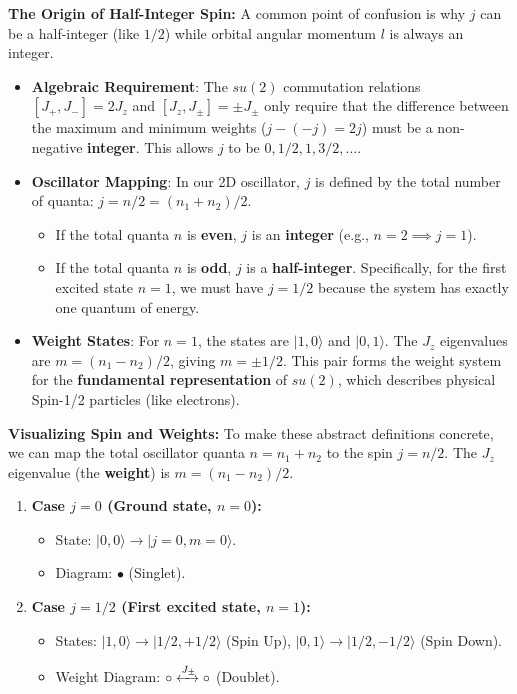 \begin{solution}
\begin{remark}
\textbf{The Origin of Half-Integer Spin:}
A common point of confusion is why $j$ can be a half-integer (like $1/2$) while orbital angular momentum $l$ is always an integer. 
\begin{itemize}
    \item \textbf{Algebraic Requirement}: The $su(2)$ commutation relations $[J_+, J_-] = 2J_z$ and $[J_z, J_\pm] = \pm J_\pm$ only require that the difference between the maximum and minimum weights ($j - (-j) = 2j$) must be a non-negative \textbf{integer}. This allows $j$ to be $0, 1/2, 1, 3/2, \dots$.
    \item \textbf{Oscillator Mapping}: In our 2D oscillator, $j$ is defined by the total number of quanta: $j = n/2 = (n_1 + n_2)/2$. 
    \begin{itemize}
        \item If the total quanta $n$ is \textbf{even}, $j$ is an \textbf{integer} (e.g., $n=2 \implies j=1$).
        \item If the total quanta $n$ is \textbf{odd}, $j$ is a \textbf{half-integer}. Specifically, for the first excited state $n=1$, we must have $j=1/2$ because the system has exactly one quantum of energy.
    \end{itemize}
    \item \textbf{Weight States}: For $n=1$, the states are $|1, 0\rangle$ and $|0, 1\rangle$. The $J_z$ eigenvalues are $m = (n_1 - n_2)/2$, giving $m = \pm 1/2$. This pair forms the weight system for the \textbf{fundamental representation} of $su(2)$, which describes physical Spin-1/2 particles (like electrons).
\end{itemize}

\textbf{Visualizing Spin and Weights:}
To make these abstract definitions concrete, we can map the total oscillator quanta $n = n_1 + n_2$ to the spin $j = n/2$. The $J_z$ eigenvalue (the \textbf{weight}) is $m = (n_1 - n_2)/2$.

\begin{enumerate}
    \item \textbf{Case $j=0$ (Ground state, $n=0$):}
    \begin{itemize}
        \item State: $|0, 0\rangle \to |j=0, m=0\rangle$.
        \item Diagram: $\bullet$ (Singlet).
    \end{itemize}
    
    \item \textbf{Case $j=1/2$ (First excited state, $n=1$):}
    \begin{itemize}
        \item States: 
        $|1, 0\rangle \to |1/2, +1/2\rangle$ (Spin Up), 
        $|0, 1\rangle \to |1/2, -1/2\rangle$ (Spin Down).
        \item Weight Diagram: $\circ \xleftrightarrow{J_\pm} \circ$ (Doublet).
    \end{itemize}
    

\end{enumerate}
\end{remark}
\end{solution}
